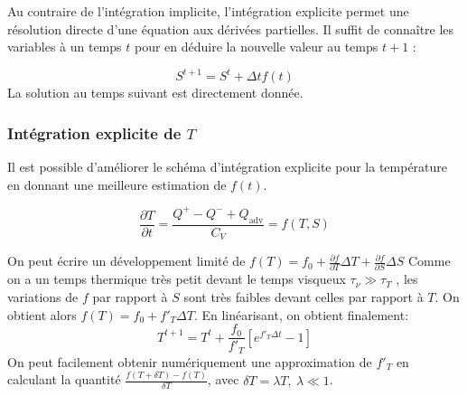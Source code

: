 Au contraire de l'intégration implicite, l'intégration explicite permet une
résolution directe d'une équation aux dérivées partielles. Il suffit de
connaître les variables à un temps $t$ pour en déduire la nouvelle valeur au
temps $t+1$ :

\begin{equation}
  S^{t+1} = S^t + \Delta t f(t)
\end{equation}
La solution au temps suivant est directement donnée.

\subsubsection{Intégration explicite de $T$}
\label{ssec:integration_T}

Il est possible d'améliorer le schéma d'intégration explicite pour la
température en donnant une meilleure estimation de $f(t)$.

\begin{equation}
  \frac{\partial T}{\partial t} = \frac{Q^+ - Q^- + Q_\textrm{adv}}{C_V} = f(T, S)
\end{equation}

On peut écrire un développement limité de $f(T) = f_0 + \frac{\partial
f}{\partial T}\Delta T + \frac{\partial f}{\partial S}\Delta S$ Comme on a un
temps thermique très petit devant le temps visqueux $\tau_\nu \gg \tau_T$
 , les variations de $f$ par rapport à $S$ sont
très faibles devant celles par rapport à $T$. On obtient alors $f(T) = f_0 +
f'_T \Delta T$. En linéarisant, on obtient finalement: \begin{equation} T^{t+1}
= T^t + \frac{f_0}{f'_T}\left[e^{f'_T\Delta t} - 1 \right] \end{equation} On
peut facilement obtenir numériquement une approximation de $f'_T$ en calculant
la quantité $\frac{f(T+\delta T) - f(T)}{\delta T}$, avec $\delta T = \lambda
T,\ \lambda \ll 1$.



